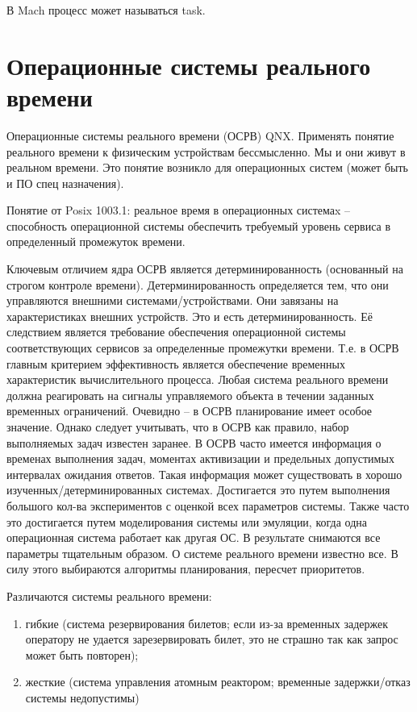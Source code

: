 В Mach процесс может называться task.

\chapter{Операционные системы реального времени}
Операционные системы реального времени (ОСРВ) QNX.
Применять понятие реального времени к физическим устройствам бессмысленно. Мы и они живут в реальном времени. Это понятие возникло для операционных систем (может быть и ПО спец назначения). 

Понятие от Posix 1003.1:
реальное время в операционных системаx – способность операционной системы обеспечить требуемый уровень сервиса в определенный промежуток времени. 

Ключевым отличием ядра ОСРВ является детерминированность (основанный на строгом контроле времени). Детерминированность определяется тем, что они управляются внешними системами/устройствами. Они завязаны на характеристиках внешних устройств. Это и есть детерминированность. Её следствием  является требование обеспечения операционной системы соответствующих сервисов за определенные промежутки времени. Т.е. в ОСРВ главным критерием эффективность является обеспечение временных характеристик вычислительного процесса. Любая система реального времени должна реагировать на сигналы управляемого объекта в течении заданных временных ограничений. Очевидно – в ОСРВ планирование имеет особое значение.  Однако следует учитывать, что в ОСРВ как правило, набор выполняемых задач известен заранее. В ОСРВ часто имеется информация о временах выполнения задач, моментах активизации и предельных допустимых интервалах ожидания ответов. Такая информация может существовать в хорошо изученных/детерминированных системах. Достигается это путем выполнения большого кол-ва экспериментов с оценкой всех параметров системы. Также часто это достигается путем моделирования системы или эмуляции, когда одна операционная система работает как другая ОС. В результате снимаются все параметры тщательным образом. О системе реального времени известно все. В силу этого выбираются алгоритмы планирования, пересчет приоритетов. 

Различаются системы реального времени:
\begin{enumerate}
    \item гибкие (система резервирования билетов; если из-за временных задержек оператору не удается зарезервировать билет, это не страшно так как запрос может быть повторен); 
    \item жесткие (система управления атомным реактором; временные задержки/отказ системы недопустимы)
\end{enumerate} 


